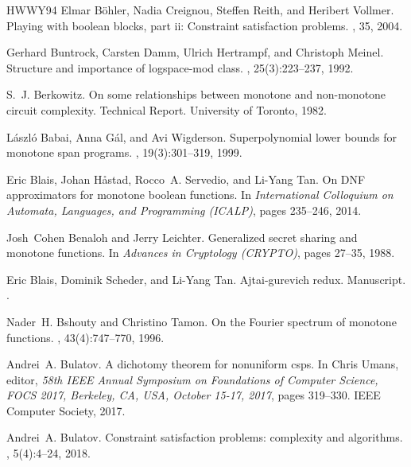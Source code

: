 \documentclass[10pt,a4paper]{article}
\begin{document}
\begin{thebibliography}{HWWY94}
Elmar Böhler, Nadia Creignou, Steffen Reith, and Heribert Vollmer.
\newblock Playing with boolean blocks, part ii: Constraint satisfaction
  problems.
, 35, 2004.

Gerhard Buntrock, Carsten Damm, Ulrich Hertrampf, and Christoph Meinel.
\newblock Structure and importance of logspace-mod class.
, 25(3):223--237, 1992.

S.~J. Berkowitz.
\newblock On some relationships between monotone and non-monotone circuit
  complexity.
\newblock Technical Report. University of Toronto, 1982.

L{\'{a}}szl{\'{o}} Babai, Anna G{\'{a}}l, and Avi Wigderson.
\newblock Superpolynomial lower bounds for monotone span programs.
, 19(3):301--319, 1999.

Eric Blais, Johan H{\aa}stad, Rocco~A. Servedio, and Li{-}Yang Tan.
\newblock On {DNF} approximators for monotone boolean functions.
\newblock In {\em International Colloquium on Automata, Languages, and
  Programming \emph{(ICALP)}}, pages 235--246, 2014.

Josh~Cohen Benaloh and Jerry Leichter.
\newblock Generalized secret sharing and monotone functions.
\newblock In {\em Advances in Cryptology \emph{(CRYPTO)}}, pages 27--35, 1988.

Eric Blais, Dominik Scheder, and Li-Yang Tan.
\newblock Ajtai-gurevich redux. {M}anuscript.
.

Nader~H. Bshouty and Christino Tamon.
\newblock On the {F}ourier spectrum of monotone functions.
, 43(4):747--770, 1996.

Andrei~A. Bulatov.
\newblock A dichotomy theorem for nonuniform csps.
\newblock In Chris Umans, editor, {\em 58th {IEEE} Annual Symposium on
  Foundations of Computer Science, {FOCS} 2017, Berkeley, CA, USA, October
  15-17, 2017}, pages 319--330. {IEEE} Computer Society, 2017.

Andrei~A. Bulatov.
\newblock Constraint satisfaction problems: complexity and algorithms.
, 5(4):4--24, 2018.


\end{thebibliography}
\end{document}
